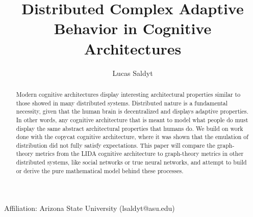 \documentclass{nature}
\title{Distributed Complex Adaptive Behavior in Cognitive Architectures}
\author{Lucas Saldyt}
\begin{document}
\maketitle

\begin{affiliations}
    \item Affiliation: Arizona State University (lsaldyt@asu.edu)
\end{affiliations}

\begin{abstract}
    Modern cognitive architectures display interesting architectural properties similar to those showed in many distributed systems.
    Distributed nature is a fundamental necessity, given that the human brain is decentralized and displays adaptive properties.
    In other words, any cognitive architecture that is meant to model what people do must display the same abstract architectural properties that humans do.
    We build on work done with the copycat cognitive architecture, where it was shown that the emulation of distribution did not fully satisfy expectations.
    This paper will compare the graph-theory metrics from the LIDA cognitive architecture to graph-theory metrics in other distributed systems, like social networks or true neural networks, and attempt to build or derive the pure mathematical model behind these processes.

\end{abstract}

\end{document}
